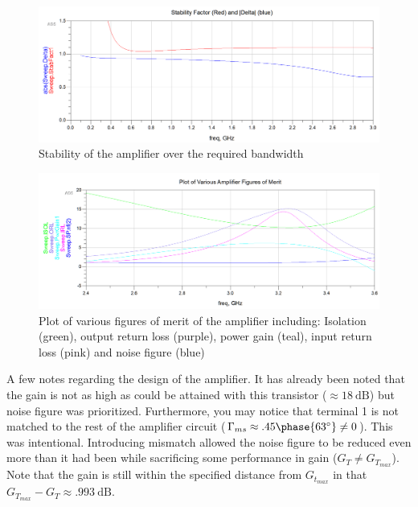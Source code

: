 \begin{figure}[H]
    \centering
    \includegraphics[width=0.8\linewidth]{Images/A2P1AmplifierFrequencySweepStability.png}
    \caption{Stability of the amplifier over the required bandwidth}
    \label{fig:A2P1AmplifierFrequencySweepStability}
\end{figure}

\begin{figure}[H]
    \centering
    \includegraphics[width=0.8\linewidth]{Images/A2P1AmplifierFOM.png}
    \caption{Plot of various figures of merit of the amplifier including:
    Isolation (green), output return loss (purple), power gain (teal), input
return loss (pink) and noise figure (blue)}
    \label{fig:A2P1AmplifierFOM}
\end{figure}

A few notes regarding the design of the amplifier. It has already been noted
that the gain is not as high as could be attained with this transistor ($\approx
\SI{18}{\deci\bel}$) but noise figure was prioritized. Furthermore, you may
notice that terminal 1 is not matched to the rest of the amplifier circuit
($\Gamma_{ms} \approx .45 \phase{63 \degree} \ne 0$). This was intentional.
Introducing mismatch allowed the noise figure to be reduced even more than it
had been while sacrificing some performance in gain ($ G_T \ne G_{T_{max}}$).
Note that the gain is still within the specified distance from $G_{t_{max}}$ in
that $G_{T_{max}} - G_T \approx \SI{.993}{\deci\bel}$.
